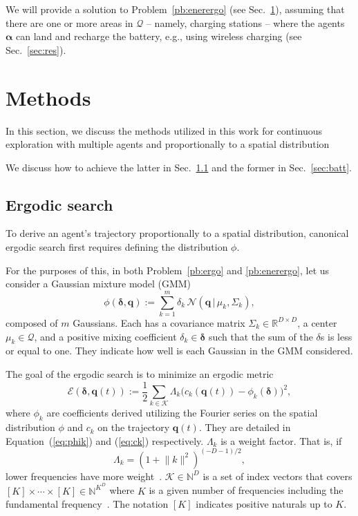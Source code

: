 \documentclass[lettersize,journal,twoside]{IEEEtran}
\theoremstyle{definition}
\begin{document}
We will provide a solution to Problem~\ref{pb:enerergo} (see Sec.~\ref{sec:meth}), assuming that there are one or more areas in $\mathcal{Q}$ -- namely, charging stations -- where the agents $\boldsymbol{\alpha}$ can land and recharge the battery, e.g., using wireless charging (see Sec.~\ref{sec:res}). 


\section{Methods}\label{sec:meth}
\noindent
In this section, we discuss the methods utilized in this work for continuous exploration with multiple agents and proportionally to a spatial distribution

We discuss how to achieve the latter in Sec.~\ref{sec:ergosearch} and the former in Sec.~\ref{sec:batt}.

\subsection{Ergodic search}\label{sec:ergosearch}
\noindent
To derive an agent's trajectory proportionally to a spatial distribution, canonical ergodic search first requires defining the distribution $\phi$.

For the purposes of this, in both Problem~\ref{pb:ergo} and \ref{pb:enerergo}, let us consider a Gaussian mixture model (GMM)
\begin{equation}\label{eq:gmm}
  \phi(\boldsymbol{\delta},\mathbf{q}):=\sum_{k=1}^{m}\delta_k\,\mathcal{N}(\mathbf{q}\,|\,\mu_k,\Sigma_k),
\end{equation} 
composed of $m$ Gaussians. Each has a covariance matrix ${\Sigma_k}\in\mathbb{R}^{D\times D}$, a center $\mu_k\in\mathcal{Q}$, and a positive mixing coefficient $\delta_k\in\boldsymbol{\delta}$ such that the sum of the $\delta$s is less or equal to one. They indicate how well is each Gaussian in the GMM considered. 

The goal of the ergodic search is to minimize an ergodic metric~\cite{mathew2011metrics}
\begin{equation}\label{eq:ergmetric}
  \mathcal{E}(\boldsymbol{\delta},\mathbf{q}(t)):=\frac{1}{2}\sum_{k\in\mathcal{K}}\Lambda_k \big( c_k(\mathbf{q}(t))-\phi_k(\boldsymbol{\delta}) \big)^2,
\end{equation}
where $\phi_k$ are coefficients derived utilizing the Fourier series on the spatial distribution $\phi$ and $c_k$ on the trajectory $\mathbf{q}(t)$. They are detailed in Equation~(\ref{eq:phik}) and (\ref{eq:ck}) respectively.
$\Lambda_k$ is a weight factor. That is, if 
\begin{equation}
  \Lambda_k=(1+\lVert k\rVert^2)^{(-D-1)/2},
\end{equation}
lower frequencies have more weight~\cite{miller2016ergodic}.
$\mathcal{K}\in\mathbb{N}^D$ is a set of index vectors that covers $[K]\times\cdots\times[K]\in\mathbb{N}^{K^D}$ 
where $K$ is a given number of frequencies including the fundamental frequency~\cite{calinon2020mixture}. The notation $[K]$ indicates positive naturals up to $K$.
\end{document}
